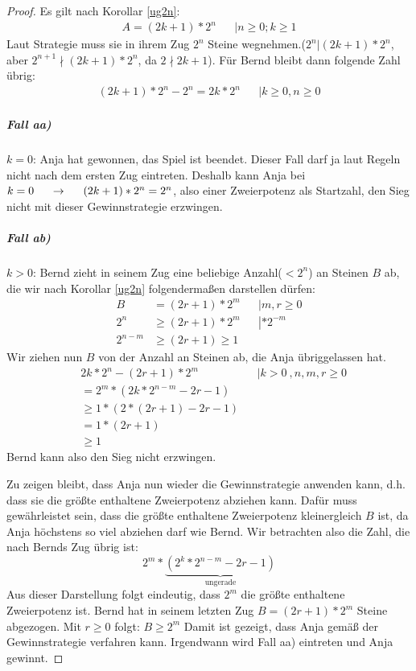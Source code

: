 \documentclass[12pt]{article}
\numberwithin{equation}{subsection}
\begin{document}
\begin{proof}
Es gilt nach Korollar \ref{ug2n}:
\begin{align*}
A=(2k+1)*2^n &&\left| n\ge 0; k\ge1 \right.
\end{align*}
Laut Strategie muss sie in ihrem Zug $2^n$ Steine wegnehmen.($2^n|(2k+1)*2^n$, aber $2^{n+1}\nmid (2k+1)*2^n$, da $2\nmid 2k+1$).
Für Bernd bleibt dann folgende Zahl übrig:
\begin{align*}
	(2k+1)*2^n-2^n=2k*2^n&&\left|k\ge 0, n\ge 0\right.
\end{align*}
\subparagraph{Fall aa)}
$k=0$: Anja hat gewonnen, das Spiel ist beendet.
Dieser Fall darf ja laut Regeln nicht nach dem ersten Zug eintreten. Deshalb kann Anja bei $k=0\hspace{5mm} \to\hspace{5mm} (2k+1)*2^n=2^n$, also einer Zweierpotenz als Startzahl, den Sieg nicht mit dieser Gewinnstrategie erzwingen.
\subparagraph{Fall ab)}
$k>0$: Bernd zieht in seinem Zug eine beliebige Anzahl($<2^n$) an Steinen $B$ ab, die wir nach Korollar \ref{ug2n} folgendermaßen darstellen dürfen:
\begin{align*}
	B&=(2r+1)*2^m&&\left|m,r\ge 0\right.\\
	2^n&\ge(2r+1)*2^m&&\left| *2^{-m}\right.\\
	2^{n-m}&\ge(2r+1)\ge 1
\end{align*}
Wir ziehen nun $B$ von der Anzahl an Steinen ab, die Anja übriggelassen hat.
\begin{align*}
	&2k*2^n-(2r+1)*2^m&&|k>0\ ,n,m,r\ge 0\\
	&=2^m*\left(2k*2^{n-m}-2r-1\right)\\
	&\ge 1*\left(2*(2r+1)-2r-1\right)\\
	&=1*(2r+1)\\
	&\ge 1
\end{align*}
Bernd kann also den Sieg nicht erzwingen.

Zu zeigen bleibt, dass Anja nun wieder die Gewinnstrategie anwenden kann, d.h. dass sie die größte  enthaltene Zweierpotenz abziehen kann.
Dafür muss gewährleistet sein, dass die größte enthaltene Zweierpotenz kleinergleich $B$ ist, da Anja höchstens so viel abziehen darf wie Bernd.
Wir betrachten also die Zahl, die nach Bernds Zug übrig ist: \[2^m*\underbrace{\left(2^k*2^{n-m}-2r-1\right)}_{\mathrm{ungerade}}\]
Aus dieser Darstellung folgt eindeutig, dass $2^m$ die größte enthaltene Zweierpotenz ist.
Bernd hat in seinem letzten Zug $B=(2r+1)*2^m$ Steine abgezogen. Mit $r\ge 0$ folgt: $B\ge 2^m$
Damit ist gezeigt, dass Anja gemäß der Gewinnstrategie verfahren kann. Irgendwann wird Fall aa) eintreten und Anja gewinnt.
\end{proof}
\end{document}
